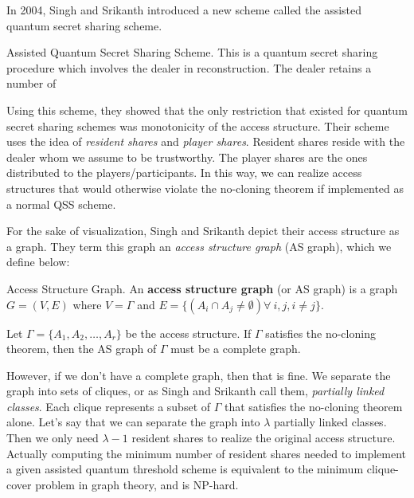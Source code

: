 In 2004, Singh and Srikanth introduced a new scheme called the assisted quantum secret sharing scheme. 

\begin{definition}{Assisted Quantum Secret Sharing Scheme.}
    \label{defn:aqss}
    This is a quantum secret sharing procedure which involves the dealer in reconstruction. The dealer retains a number of 
\end{definition}

Using this scheme, they showed that the only restriction that existed for quantum secret sharing schemes was monotonicity of the access structure. Their scheme uses the idea of \textit{resident shares} and \textit{player shares}. Resident shares reside with the dealer whom we assume to be trustworthy. The player shares are the ones distributed to the players/participants. In this way, we can realize access structures that would otherwise violate the no-cloning theorem if implemented as a normal QSS scheme. 

For the sake of visualization, Singh and Srikanth depict their access structure as a graph. They term this graph an \textit{access structure graph} (AS graph), which we define below:

\begin{definition}{Access Structure Graph.}
    \label{defn:access-structure-graph}
    An \textbf{access structure graph} (or AS graph) is a graph $G = (V,E)$ where $V = \Gamma$ and $E = \{(A_i \cap A_j \neq \emptyset) \forall\:i,j,i\neq j\}$.
\end{definition}

\begin{proposition}
    \label{prop:complete-as-graph}
    Let $\Gamma = \{A_1,A_2,\dots,A_r\}$ be the access structure. If $\Gamma$ satisfies the no-cloning theorem, then the AS graph of $\Gamma$ must be a complete graph.
\end{proposition}

However, if we don't have a complete graph, then that is fine. We separate the graph into sets of cliques, or as Singh and Srikanth call them, \textit{partially linked classes}. Each clique represents a subset of $\Gamma$ that satisfies the no-cloning theorem alone. Let's say that we can separate the graph into $\lambda$ partially linked classes. Then we only need $\lambda - 1$ resident shares to realize the original access structure. Actually computing the minimum number of resident shares needed to implement a given assisted quantum threshold scheme is equivalent to the minimum clique-cover problem in graph theory, and is NP-hard.

